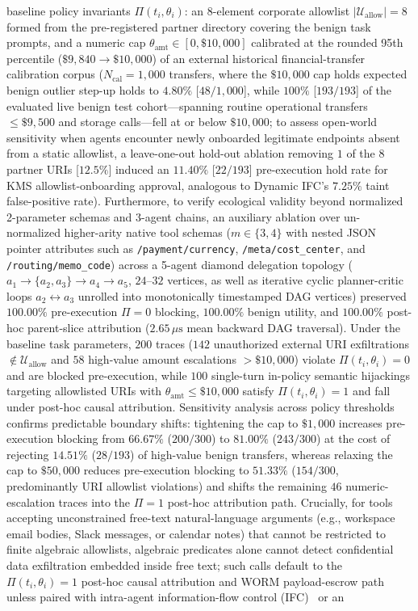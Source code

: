 \documentclass[conference,10pt]{IEEEtran}
\begin{document}
baseline policy invariants $\Pi(t_i, \theta_i)$: an 8-element corporate allowlist $|\mathcal{U}_{\text{allow}}| = 8$ formed from the pre-registered partner directory covering the benign task prompts, and a numeric cap $\theta_{\text{amt}} \in [0, \$10{,}000]$ calibrated at the rounded 95th percentile ($\$9{,}840 \to \$10{,}000$) of an external historical financial-transfer calibration corpus ($N_{\text{cal}} = 1{,}000$ transfers, where the $\$10{,}000$ cap holds expected benign outlier step-up holds to $4.80\%$ [$48/1{,}000$], while $100\%$ [$193/193$] of the evaluated live benign test cohort---spanning routine operational transfers $\le \$9{,}500$ and storage calls---fell at or below $\$10{,}000$; to assess open-world sensitivity when agents encounter newly onboarded legitimate endpoints absent from a static allowlist, a leave-one-out hold-out ablation removing $1$ of the $8$ partner URIs [$12.5\%$] induced an $11.40\%$ [$22/193$] pre-execution hold rate for KMS allowlist-onboarding approval, analogous to Dynamic IFC's $7.25\%$ taint false-positive rate). Furthermore, to verify ecological validity beyond normalized 2-parameter schemas and 3-agent chains, an auxiliary ablation over un-normalized higher-arity native tool schemas ($m \in \{3, 4\}$ with nested JSON pointer attributes such as \texttt{/payment/currency}, \texttt{/meta/cost\_center}, and \texttt{/routing/memo\_code}) across a 5-agent diamond delegation topology ($a_1 \to \{a_2, a_3\} \to a_4 \to a_5$, $24$--$32$ vertices, as well as iterative cyclic planner-critic loops $a_2 \leftrightarrow a_3$ unrolled into monotonically timestamped DAG vertices) preserved $100.00\%$ pre-execution $\Pi=0$ blocking, $100.00\%$ benign utility, and $100.00\%$ post-hoc parent-slice attribution ($2.65\,\mu\text{s}$ mean backward DAG traversal). Under the baseline task parameters, $200$ traces ($142$ unauthorized external URI exfiltrations $\notin \mathcal{U}_{\text{allow}}$ and $58$ high-value amount escalations $> \$10{,}000$) violate $\Pi(t_i, \theta_i) = 0$ and are blocked pre-execution, while $100$ single-turn in-policy semantic hijackings targeting allowlisted URIs with $\theta_{\text{amt}} \le \$10{,}000$ satisfy $\Pi(t_i, \theta_i) = 1$ and fall under post-hoc causal attribution. Sensitivity analysis across policy thresholds confirms predictable boundary shifts: tightening the cap to $\$1{,}000$ increases pre-execution blocking from $66.67\%$ ($200/300$) to $81.00\%$ ($243/300$) at the cost of rejecting $14.51\%$ ($28/193$) of high-value benign transfers, whereas relaxing the cap to $\$50{,}000$ reduces pre-execution blocking to $51.33\%$ ($154/300$, predominantly URI allowlist violations) and shifts the remaining $46$ numeric-escalation traces into the $\Pi = 1$ post-hoc attribution path. Crucially, for tools accepting unconstrained free-text natural-language arguments (e.g., workspace email bodies, Slack messages, or calendar notes) that cannot be restricted to finite algebraic allowlists, algebraic predicates alone cannot detect confidential data exfiltration embedded inside free text; such calls default to the $\Pi(t_i, \theta_i) = 1$ post-hoc causal attribution and WORM payload-escrow path unless paired with intra-agent information-flow control (IFC)~\cite{debenedetti2025camel, costa2025fides, shi2025progent} or an 
\end{document}

